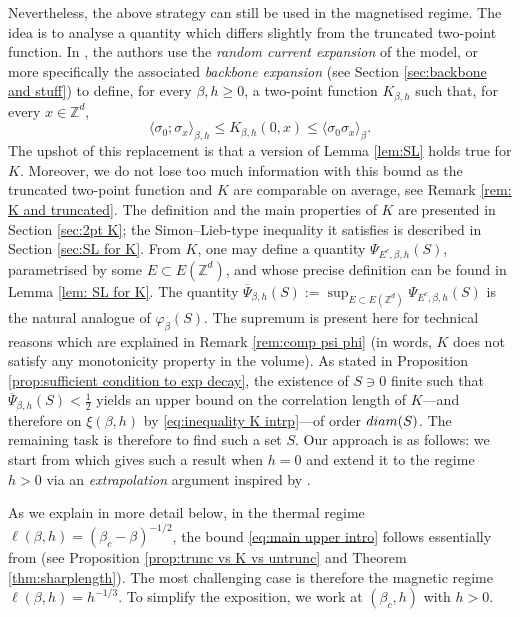 \documentclass[10pt,a4paper]{amsart}
\numberwithin{equation}{section}
\begin{document}
Nevertheless, the above strategy can still be used in the magnetised regime. The idea is to analyse a quantity which differs slightly from the truncated two-point function. In \cite{AizenmanFernandezCriticalBehaviorMagnetization1986}, the authors use the \emph{random current expansion} of the model, or more specifically the associated \emph{backbone expansion} (see Section \ref{sec:backbone and stuff}) to define, for every $\beta,h\geq 0$, a two-point function $K_{\beta,h}$ such that, for every $x\in \mathbb Z^d$,
\begin{equation}\label{eq:inequality K intrp}
	\langle \sigma_0;\sigma_x\rangle_{\beta,h}\leq K_{\beta,h}(0,x)\leq \langle \sigma_0\sigma_x\rangle_{\beta}.
\end{equation}
The upshot of this replacement is that a version of Lemma \ref{lem:SL} holds true for $K$. Moreover, we do not lose too much information with this bound as the truncated two-point function and $K$ are comparable on average, see Remark \ref{rem: K and truncated}. The definition and the main properties of $K$ are presented in Section \ref{sec:2pt K}; the Simon--Lieb-type inequality it satisfies is described in Section \ref{sec:SL for K}. From $K$, one may define a quantity $\Psi_{E^c,\beta,h}(S)$, parametrised by some $E\subset E(\mathbb Z^d)$, and whose precise definition can be found in Lemma \ref{lem: SL for K}. The quantity $\overline{\Psi}_{\beta,h}(S):=\sup_{E\subset E(\mathbb Z^d)}\Psi_{E^c,\beta,h}(S)$ is the natural analogue of $\varphi_{\beta}(S)$. The supremum is present here for technical reasons which are explained in Remark \ref{rem:comp psi phi} (in words, $K$ does not satisfy any monotonicity property in the volume). As stated in Proposition \ref{prop:sufficient condition to exp decay}, the existence of $S\ni 0$ finite such that $\overline{\Psi}_{\beta,h}(S)< \tfrac{1}{2}$ yields an upper bound on the correlation length of $K$---and therefore on $\xi(\beta,h)$ by \eqref{eq:inequality K intrp}---of order $\textup{diam}(S)$. The remaining task is therefore to find such a set $S$. Our approach is as follows: we start from \cite{DuminilPanis2024newLB} which gives such a result when $h=0$ and extend it to the regime $h>0$ via an 
\emph{extrapolation} argument inspired by \cite{AizenmanFernandezCriticalBehaviorMagnetization1986}. 

As we explain in more detail below, in the thermal regime $\ell(\beta,h)=(\beta_c-\beta)^{-1/2}$, the bound \eqref{eq:main upper intro} follows essentially from \cite{DuminilPanis2024newLB} (see Proposition \ref{prop:trunc vs K vs untrunc} and Theorem \ref{thm:sharplength}). The most challenging case is therefore the magnetic regime $\ell(\beta,h)=h^{-1/3}$. To simplify the exposition, we work at $(\beta_c,h)$ with $h>0$.
\end{document}
